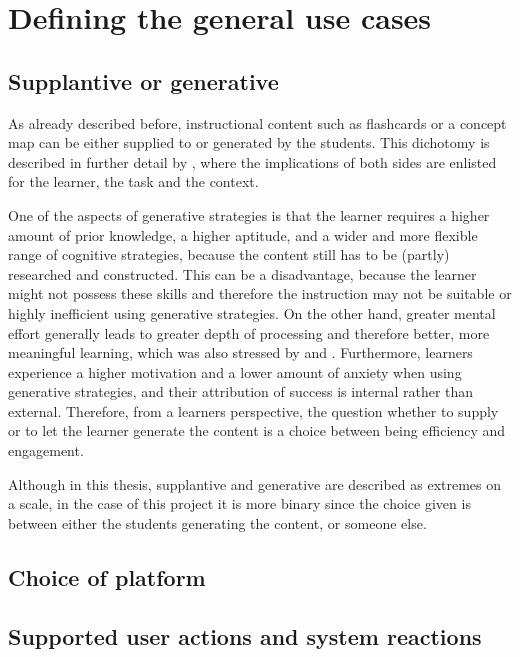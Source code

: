 \chapter{Defining the general use cases}

\section{Supplantive or generative}

As already described before, instructional content such as flashcards or a concept map can be either supplied to or generated by the students. This dichotomy is described in further detail by , where the implications of both sides are enlisted for the learner, the task and the context.

One of the aspects of generative strategies is that the learner requires a higher amount of prior knowledge, a higher aptitude, and a wider and more flexible range of cognitive strategies, because the content still has to be (partly) researched and constructed. This can be a disadvantage, because the learner might not possess these skills and therefore the instruction may not be suitable or highly inefficient using generative strategies. On the other hand, greater mental effort generally leads to greater depth of processing and therefore better, more meaningful learning, which was also stressed by  and . Furthermore, learners experience a higher motivation and a lower amount of anxiety when using generative strategies, and their attribution of success is internal rather than external. Therefore, from a learners perspective, the question whether to supply or to let the learner generate the content is a choice between being efficiency and engagement.

Although in this thesis, supplantive and generative are described as extremes on a scale, in the case of this project it is more binary since the choice given is between either the students generating the content, or someone else.

\section{Choice of platform}

\section{Supported user actions and system reactions}
